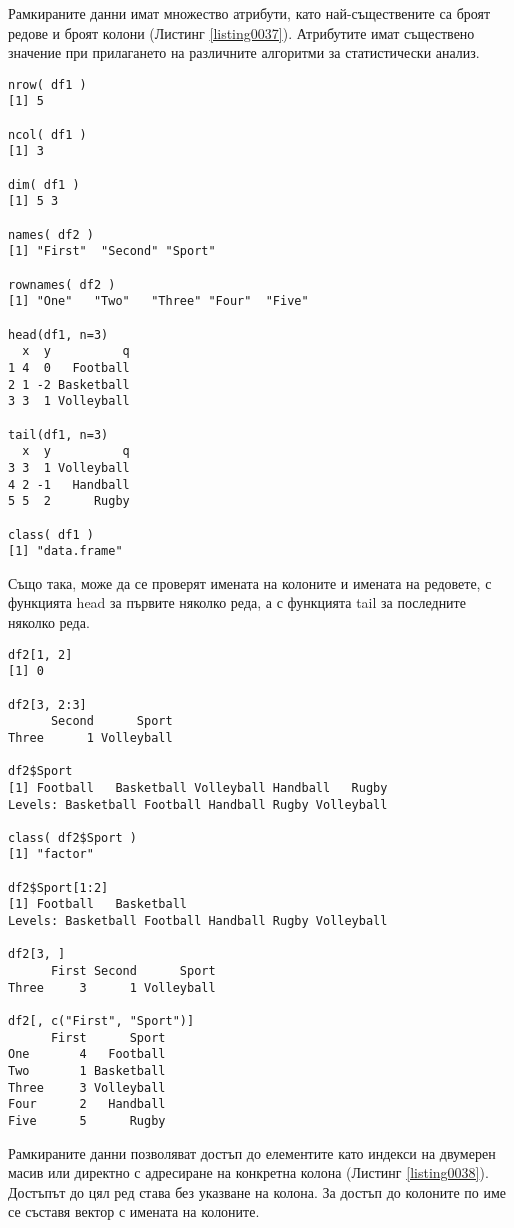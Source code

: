 Рамкираните данни имат множество атрибути, като най-съществените са броят редове и броят колони (Листинг \ref{listing0037}). Атрибутите имат съществено значение при прилагането на различните алгоритми за статистически анализ.

\begin{lstlisting}[caption=Атрибути на рамкираните данни, label=listing0037]
nrow( df1 )
[1] 5

ncol( df1 )
[1] 3

dim( df1 )
[1] 5 3

names( df2 )
[1] "First"  "Second" "Sport"

rownames( df2 )
[1] "One"   "Two"   "Three" "Four"  "Five" 

head(df1, n=3)
  x  y          q
1 4  0   Football
2 1 -2 Basketball
3 3  1 Volleyball

tail(df1, n=3)
  x  y          q
3 3  1 Volleyball
4 2 -1   Handball
5 5  2      Rugby

class( df1 )
[1] "data.frame"
\end{lstlisting}

Също така, може да се проверят имената на колоните и имената на редовете, с функцията head за първите няколко реда, а с функцията tail за последните няколко реда.

\begin{lstlisting}[caption=Фактори в рамковите данни, label=listing0038]
df2[1, 2]
[1] 0

df2[3, 2:3]
      Second      Sport
Three      1 Volleyball

df2$Sport
[1] Football   Basketball Volleyball Handball   Rugby     
Levels: Basketball Football Handball Rugby Volleyball

class( df2$Sport )
[1] "factor"

df2$Sport[1:2]
[1] Football   Basketball
Levels: Basketball Football Handball Rugby Volleyball

df2[3, ]
      First Second      Sport
Three     3      1 Volleyball

df2[, c("First", "Sport")]
      First      Sport
One       4   Football
Two       1 Basketball
Three     3 Volleyball
Four      2   Handball
Five      5      Rugby
\end{lstlisting}

Рамкираните данни позволяват достъп до елементите като индекси на двумерен масив или директно с адресиране на конкретна колона (Листинг \ref{listing0038}). Достъпът до цял ред става без указване на колона. За достъп до колоните по име се съставя вектор с имената на колоните.

